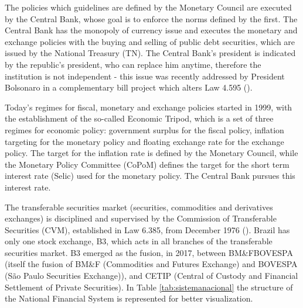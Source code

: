 \documentclass[cic,tc, english]{iiufrgs}
\begin{document}
    The policies which guidelines are defined by the Monetary Council are executed by the Central Bank, whose goal is to enforce the norms defined by the first. The Central Bank has the monopoly of currency issue and executes the monetary and exchange policies with the buying and selling of public debt securities, which are issued by the National Treasury (TN). The Central Bank's president is indicated by the republic's president, who can replace him anytime, therefore the institution is not independent - this issue was recently addressed by President Bolsonaro in a complementary bill project which alters Law 4.595 (\citet{lei4595}).

    Today's regimes for fiscal, monetary and exchange policies started in 1999, with the establishment of the so-called Economic Tripod, which is a set of three regimes for economic policy: government surplus for the fiscal policy, inflation targeting for the monetary policy and floating exchange rate for the exchange policy. The target for the inflation rate is defined by the Monetary Council, while the Monetary Policy Committee (CoPoM) defines the target for the short term interest rate (Selic) used for the monetary policy. The Central Bank pursues this interest rate.

    The transferable securities market (securities, commodities and derivatives exchanges) is disciplined and supervised by the Commission of Transferable Securities (CVM), established in Law 6.385, from December 1976 (\citet{lei6385}). Brazil has only one stock exchange, B3, which acts in all branches of the transferable securities market. B3 emerged as the fusion, in 2017, between BM\&FBOVESPA (itself the fusion of BM\&F (Commodities and Futures Exchange) and BOVESPA (São Paulo Securities Exchange)), and CETIP (Central of Custody and Financial Settlement of Private Securities).  In Table \ref{tab:sistemanacional} the structure of the National Financial System is represented for better visualization.
\end{document}
